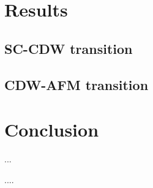 \documentclass[
    reprint, 
    aps,
    preprintnumbers,
    twocolumn,
    prb,
    superscriptaddress
]{revtex4-2}
\begin{document}
\section{Results}\label{sec:results}
 
\subsection{SC-CDW transition}

\subsection{CDW-AFM transition}


\section{Conclusion}\label{sec:conclusion}

...


\begin{acknowledgments} 
    ....
\end{acknowledgments}


%
		
\end{document}

